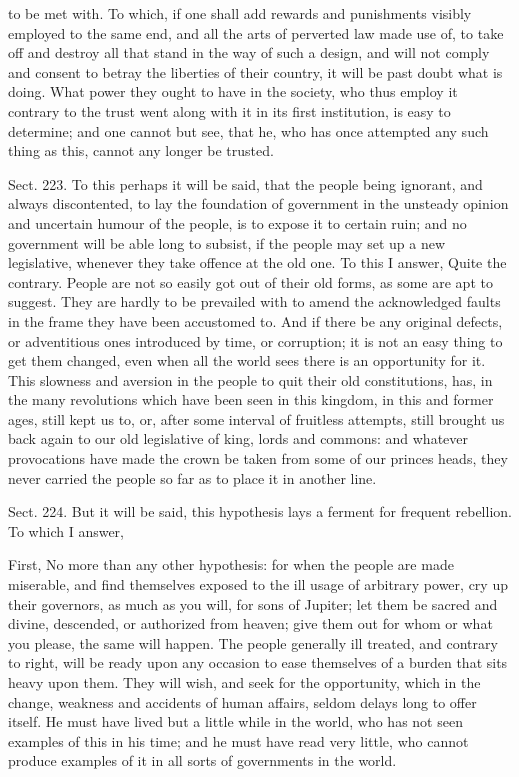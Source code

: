\documentclass[11pt,openany]{book}
\begin{document}
to be met with. To which, if one shall add rewards and punishments visibly employed to the same end, and all the arts of perverted law made use of, to take off and destroy all that stand in the way of such a design, and will not comply and consent to betray the liberties of their country, it will be past doubt what is doing. What power they ought to have in the society, who thus employ it contrary to the trust went along with it in its first institution, is easy to determine; and one cannot but see, that he, who has once attempted any such thing as this, cannot any longer be trusted.

Sect. 223. To this perhaps it will be said, that the people being ignorant, and always discontented, to lay the foundation of government in the unsteady opinion and uncertain humour of the people, is to expose it to certain ruin; and no government will be able long to subsist, if the people may set up a new legislative, whenever they take offence at the old one. To this I answer, Quite the contrary. People are not so easily got out of their old forms, as some are apt to suggest. They are hardly to be prevailed with to amend the acknowledged faults in the frame they have been accustomed to. And if there be any original defects, or adventitious ones introduced by time, or corruption; it is not an easy thing to get them changed, even when all the world sees there is an opportunity for it. This slowness and aversion in the people to quit their old constitutions, has, in the many revolutions which have been seen in this kingdom, in this and former ages, still kept us to, or, after some interval of fruitless attempts, still brought us back again to our old legislative of king, lords and commons: and whatever provocations have made the crown be taken from some of our princes heads, they never carried the people so far as to place it in another line.

Sect. 224. But it will be said, this hypothesis lays a ferment for frequent rebellion. To which I answer,

First, No more than any other hypothesis: for when the people are made miserable, and find themselves exposed to the ill usage of arbitrary power, cry up their governors, as much as you will, for sons of Jupiter; let them be sacred and divine, descended, or authorized from heaven; give them out for whom or what you please, the same will happen. The people generally ill treated, and contrary to right, will be ready upon any occasion to ease themselves of a burden that sits heavy upon them. They will wish, and seek for the opportunity, which in the change, weakness and accidents of human affairs, seldom delays long to offer itself. He must have lived but a little while in the world, who has not seen examples of this in his time; and he must have read very little, who cannot produce examples of it in all sorts of governments in the world.
\end{document}
